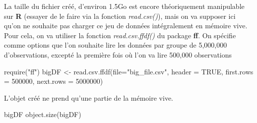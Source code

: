 \documentclass[
]{book}
\newenvironment{Shaded}{\begin{snugshade}}{\end{snugshade}}
\newcommand{\AttributeTok}[1]{\textcolor[rgb]{0.77,0.63,0.00}{#1}}
\newcommand{\ConstantTok}[1]{\textcolor[rgb]{0.00,0.00,0.00}{#1}}
\newcommand{\ControlFlowTok}[1]{\textcolor[rgb]{0.13,0.29,0.53}{\textbf{#1}}}
\newcommand{\DecValTok}[1]{\textcolor[rgb]{0.00,0.00,0.81}{#1}}
\newcommand{\FloatTok}[1]{\textcolor[rgb]{0.00,0.00,0.81}{#1}}
\newcommand{\FunctionTok}[1]{\textcolor[rgb]{0.00,0.00,0.00}{#1}}
\newcommand{\NormalTok}[1]{#1}
\newcommand{\OtherTok}[1]{\textcolor[rgb]{0.56,0.35,0.01}{#1}}
\newcommand{\SpecialCharTok}[1]{\textcolor[rgb]{0.00,0.00,0.00}{#1}}
\newcommand{\StringTok}[1]{\textcolor[rgb]{0.31,0.60,0.02}{#1}}
\theoremstyle{definition}
\theoremstyle{definition}
\theoremstyle{definition}
\theoremstyle{definition}
\theoremstyle{remark}
\begin{document}
\begin{Shaded}
\end{Shaded}

La taille du fichier créé, d'environ 1.5Go est encore théoriquement manipulable sur \textbf{R} (essayer de le faire via la fonction \emph{read.csv()}), mais on va supposer ici qu'on ne souhaite pas charger ce jeu de données intégralement en mémoire vive. Pour cela, on va utiliser la fonction \emph{read.csv.ffdf()} du package \textbf{ff}. On spécifie comme options que l'on souhaite lire les données par groupe de 5,000,000 d'observations, excepté la première fois où l'on va lire 500,000 observations

\begin{Shaded}
\begin{Highlighting}[]
\FunctionTok{require}\NormalTok{(}\StringTok{"ff"}\NormalTok{)}
\NormalTok{bigDF }\OtherTok{\textless{}{-}} \FunctionTok{read.csv.ffdf}\NormalTok{(}\AttributeTok{file=}\StringTok{"big\_file.csv"}\NormalTok{, }\AttributeTok{header =} \ConstantTok{TRUE}\NormalTok{,}
                       \AttributeTok{first.rows =} \DecValTok{500000}\NormalTok{, }\AttributeTok{next.rows =} \DecValTok{5000000}\NormalTok{)}
\end{Highlighting}
\end{Shaded}

L'objet créé ne prend qu'une partie de la mémoire vive.

\begin{Shaded}
\begin{Highlighting}[]
\NormalTok{bigDF}
\FunctionTok{object.size}\NormalTok{(bigDF)}
\end{Highlighting}
\end{Shaded}
\end{document}
